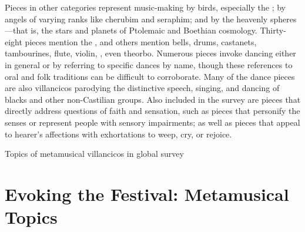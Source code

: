 Pieces in other categories represent music-making by birds, especially the 
; by angels of varying ranks like cherubim and 
seraphim; and by the heavenly spheres---that is, the stars and planets of 
Ptolemaic and Boethian cosmology.
Thirty-eight pieces mention the , and others 
mention bells, drums, castanets, tambourines, flute, violin, 
, even theorbo.
Numerous pieces invoke dancing either in general or by referring to specific 
dances by name, though these references to oral and folk traditions can be 
difficult to corroborate.
Many of the dance pieces are also  villancicos parodying the 
distinctive speech, singing, and dancing of blacks and other non-Castilian 
groups.
Also included in the survey are pieces that directly address questions of faith 
and sensation, such as pieces that personify the senses or represent people 
with sensory impairments; as well as pieces that appeal to hearer's affections 
with exhortations to weep, cry, or rejoice.

\begin{table}
\caption{Topics of metamusical villancicos in global survey}
\label{table:metamusical-survey}
\end{table}

\section{Evoking the Festival: Metamusical Topics}

